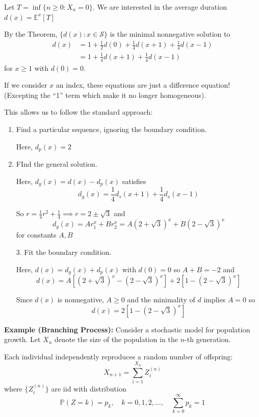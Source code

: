 \documentclass[12pt]{report}
\renewcommand{\P}{\mathbb{P}}
\newcommand{\E}{\mathbb{E}}
\renewcommand{\S}{\mathcal{S}}
\begin{document}
    Let $T = \inf\{n \geq 0: X_n = 0\}$. We are interested in the average duration $d(x) = \E^x[T]$

    By the Theorem, $\{d(x): x \in \S\}$ is the minimal nonnegative solution to
    \begin{align*}
        d(x) &= 1 + \frac{1}{2}d(0) + \frac{1}{4}d(x + 1) + \frac{1}{4}d(x - 1)\\ 
        &= 1 + \frac{1}{4}d(x + 1) + \frac{1}{4}d(x - 1)
    \end{align*}
    for $x \geq 1$ with $d(0) = 0$. 

    If we consider $x$ an index, these equations are just a difference equation! (Excepting the ``1'' term which make it no longer homogeneous). 
    
    This allows us to follow the standard approach:
    \begin{enumerate}
        \item Find a particular sequence, ignoring the boundary condition. 
        
        Here, $d_p(x) = 2$

        \item FInd the general solution. 
        
        Here, $d_g(x) = d(x) - d_p(x)$ satisfies 
        \[d_g(x) = \frac{1}{4}d_{s}(x + 1) + \frac{1}{4}d_s(x - 1)\] 

        So $r = \frac{1}{4}r^2 + \frac{1}{4} \implies r = 2 \pm \sqrt{3}$ and 
        \[d_g(x) = Ar_1^x + Br_2^x = A(2 + \sqrt{3})^x + B(2 - \sqrt{3})^x\] 
        for constants $A, B$

        3. Fit the boundary condition. 

        Here, $d(x) = d_g(x) + d_p(x)$ with $d(0) = 0$ so $A + B = -2$ and 
        \[d(x) = A\left[(2 + \sqrt 3)^x - (2 - \sqrt 3)^x\right] + 2\left[1 - (2 - \sqrt 3)^x\right]\]

        Since $d(x)$ is nonnegative, $A \geq 0$ and the minimality of $d$ implies $A = 0$ so 
        \[d(x) = 2[1 -(2 - \sqrt 3)^x]\] 
    \end{enumerate}

    \textbf{Example (Branching Process):} Consider a stochastic model for population growth. Let $X_n$ denote the size of the population in the $n$-th generation. 

    Each individual independently reproduces a random number of offspring:
    \[X_{n+1} = \sum_{i=1}^{X_n} Z_i^{(n)} \]
    where $\{Z_i^{(n)}\}$ are iid with distribution 
    \[\P(Z = k) = p_k, \quad k = 0, 1, 2, \dots, \quad \sum_{k=0}^\infty p_k = 1\] 
\end{document}

